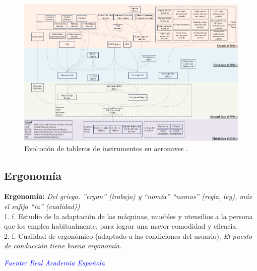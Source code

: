 \begin{landscape}
  \begin{figure}[!htb]
    \centering
    \includegraphics[width=\linewidth]{01.tablero.instrumentos/imagenes/1.1.introduccion/evolucion_cabina_00.png}

    \caption{Evoluci\'on de tableros de instrumentos en aeronaves
      \protect\cite{Lim2018AvionicsHI}.}
    \label{fig:01.evolucion.tableros.instrumentos}
  \end{figure}
\end{landscape}




\subsection{Ergonom\'ia}
\label{sec:ergonomia}

\begin{tcolorbox}
{\bf Ergonom\'ia:} 
\emph{Del griego.
  ''ergon'' (trabajo) y ``nom\'ia''
  ``nomos'' (regla, ley),
  m\'as el sufijo ``ia'' (cualidad))}\\
1. f. Estudio de la adaptaci\'on de las m\'aquinas, muebles y utensilios a la persona que los emplea habitualmente, para lograr una mayor comodidad y eficacia.\\
2. f. Cualidad de ergon\'omico (adaptado a las condiciones del
usuario). \emph{El puesto de conducci\'on tiene buena ergonom\'ia.}

\begin{flushright}
  \textcolor{blue}{\it Fuente: Real Academia Espa\~nola }
\end{flushright}

\end{tcolorbox}


